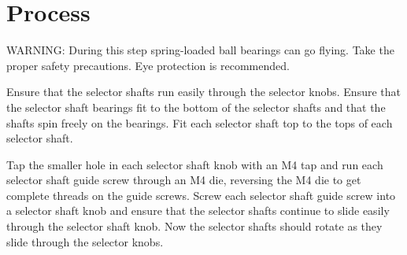 \documentclass[openany]{book}
\begin{document}
\section{Process}
WARNING: During this step spring-loaded ball bearings can go flying. Take the proper safety precautions. Eye protection is recommended.

Ensure that the selector shafts run easily through the selector knobs. Ensure that the selector shaft bearings fit to the bottom of the selector shafts and that the shafts spin freely on the bearings. Fit each selector shaft top to the tops of each selector shaft.

Tap the smaller hole in each selector shaft knob with an M4 tap and run each selector shaft guide screw through an M4 die, reversing the M4 die to get complete threads on the guide screws. Screw each selector shaft guide screw into a selector shaft knob and ensure that the selector shafts continue to slide easily through the selector shaft knob. Now the selector shafts should rotate as they slide through the selector knobs.
\end{document}
